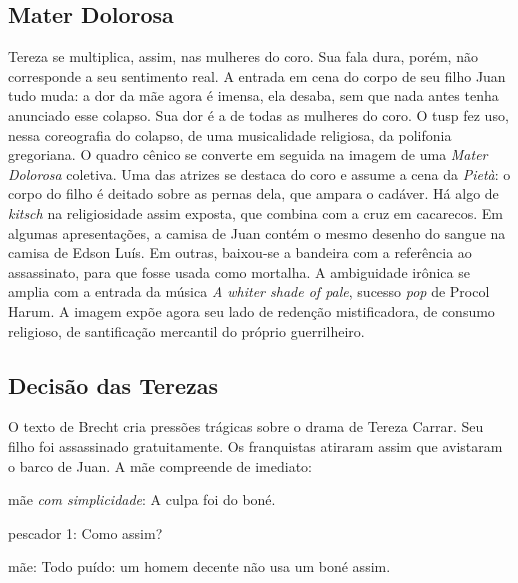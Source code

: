 
\subsection{Mater Dolorosa}

Tereza se multiplica, assim, nas mulheres do coro. Sua fala dura, porém,
não corresponde a seu sentimento real. A entrada em cena do corpo de seu
filho Juan tudo muda: a dor da mãe agora é imensa, ela desaba, sem que
nada antes tenha anunciado esse colapso. Sua dor é a de todas as
mulheres do coro. O {\sc tusp} fez uso, nessa coreografia do colapso, de uma
musicalidade religiosa, da polifonia gregoriana. O quadro cênico se
converte em seguida na imagem de uma {\it Mater Dolorosa} coletiva. Uma
das atrizes se destaca do coro e assume a cena da {\it Pietà}: o corpo
do filho é deitado sobre as pernas dela, que ampara o cadáver. Há algo
de {\it kitsch} na religiosidade assim exposta, que combina com a cruz
em cacarecos. Em algumas apresentações, a camisa de Juan contém o mesmo
desenho do sangue na camisa de Edson Luís. Em outras, baixou-se a
bandeira com a referência ao assassinato, para que fosse usada como
mortalha. A ambiguidade irônica se amplia com a entrada da música {\it A
whiter shade of pale}, sucesso {\it pop} de Procol Harum. A imagem expõe
agora seu lado de redenção mistificadora, de consumo religioso, de
santificação mercantil do próprio guerrilheiro.


\subsection{Decisão das Terezas}

O texto de Brecht cria pressões trágicas sobre o drama de Tereza Carrar.
Seu filho foi assassinado gratuitamente. Os franquistas atiraram assim
que avistaram o barco de Juan. A mãe compreende de imediato:

{\sc mãe} {\it com simplicidade}: A culpa foi do boné.

{\sc pescador} 1: Como assim?

{\sc mãe}: Todo puído: um homem decente não usa um boné assim.

